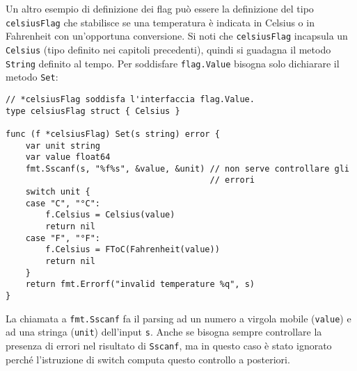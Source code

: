 \documentclass[../../thesis.tex]{subfiles}
\begin{document}
    Un altro esempio di definizione dei flag può essere la definizione del tipo \verb"celsiusFlag" che stabilisce se una temperatura è indicata in Celsius o in Fahrenheit con un'opportuna conversione.
    Si noti che \verb"celsiusFlag" incapsula un \verb"Celsius" (tipo definito nei capitoli precedenti), quindi si guadagna il metodo \verb"String" definito al tempo.
    Per soddisfare \verb"flag.Value" bisogna solo dichiarare il metodo \verb"Set":
    \begin{lstlisting}[frame = single,label={lst:lstlisting6-4.5}]
// *celsiusFlag soddisfa l'interfaccia flag.Value.
type celsiusFlag struct { Celsius }

func (f *celsiusFlag) Set(s string) error {
    var unit string
    var value float64
    fmt.Sscanf(s, "%f%s", &value, &unit) // non serve controllare gli
                                         // errori
    switch unit {
    case "C", "°C":
        f.Celsius = Celsius(value)
        return nil
    case "F", "°F":
        f.Celsius = FToC(Fahrenheit(value))
        return nil
    }
    return fmt.Errorf("invalid temperature %q", s)
}
    \end{lstlisting}
    La chiamata a \verb"fmt.Sscanf" fa il parsing ad un numero a virgola mobile (\verb"value") e ad una stringa (\verb"unit") dell'input \verb"s".
    Anche se bisogna sempre controllare la presenza di errori nel risultato di \verb"Sscanf", ma in questo caso è stato ignorato perché l'istruzione di switch computa questo controllo a posteriori.
    \hfill \vspace{12pt}
\end{document}
